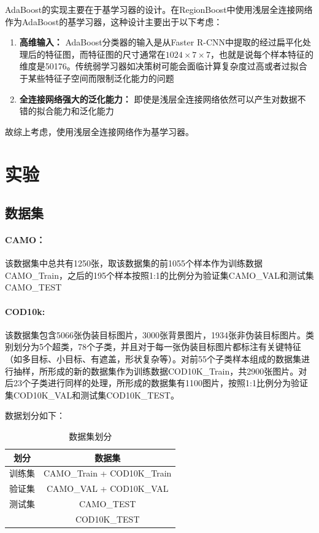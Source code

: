 \documentclass[a4paper,12pt]{ctexart}
\begin{document}
AdaBoost的实现主要在于基学习器的设计。在RegionBoost中使用浅层全连接网络作为AdaBoost的基学习器，这种设计主要出于以下考虑：
\begin{enumerate}
    \item \textbf{高维输入：} AdaBoost分类器的输入是从Faster R-CNN中提取的经过扁平化处理后的特征图，而特征图的尺寸通常在$1024\times7\times 7$，也就是说每个样本特征的维度是50176。传统弱学习器如决策树可能会面临计算复杂度过高或者过拟合于某些特征子空间而限制泛化能力的问题
    \item \textbf{全连接网络强大的泛化能力：} 即使是浅层全连接网络依然可以产生对数据不错的拟合能力和泛化能力
\end{enumerate}
故综上考虑，使用浅层全连接网络作为基学习器。



\section{实验}

\subsection{数据集}
\paragraph{CAMO\cite{Le2019AnabranchNF}：}该数据集中总共有1250张，取该数据集的前1055个样本作为训练数据CAMO\_Train，之后的195个样本按照1:1的比例分为验证集CAMO\_VAL和测试集CAMO\_TEST

\paragraph{COD10k\cite{Fan2020CamouflagedOD}: }该数据集包含5066张伪装目标图片，3000张背景图片，1934张非伪装目标图片。类别划分为5个超类，78个子类，并且对于每一张伪装目标图片都标注有关键特征（如多目标、小目标、有遮盖，形状复杂等）。对前55个子类样本组成的数据集进行抽样，所形成的新的数据集作为训练数据COD10K\_Train，共2900张图片。对后23个子类进行同样的处理，所形成的数据集有1100图片，按照1:1比例分为验证集COD10K\_VAL和测试集COD10K\_TEST。

数据划分如下：
\begin{table}[ht]
    \centering
    \begin{tabular}{|c|c|}
    \hline
    \textbf{划分} & \textbf{数据集} \\
    \hline
    训练集 & CAMO\_Train + COD10K\_Train \\
    \hline
    验证集 & CAMO\_VAL + COD10K\_VAL \\
    \hline
    测试集 & CAMO\_TEST \\
          & COD10K\_TEST \\
    \hline
    \end{tabular}
    \caption{数据集划分}
\end{table}
\end{document}
